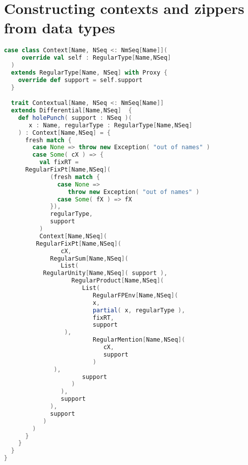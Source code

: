 \section{Constructing contexts and zippers from data types}

\begin{lstlisting}[language=Scala]
  case class Context[Name, NSeq <: NmSeq[Name]](
     override val self : RegularType[Name,NSeq]
  )
  extends RegularType[Name, NSeq] with Proxy {
    override def support = self.support
  }

  trait Contextual[Name, NSeq <: NmSeq[Name]]
  extends Differential[Name,NSeq]  {
    def holePunch( support : NSeq )(
       x : Name, regularType : RegularType[Name,NSeq]
    ) : Context[Name,NSeq] = {
      fresh match {
        case None => throw new Exception( "out of names" )
        case Some( cX ) => {
          val fixRT =
	  RegularFixPt[Name,NSeq](
             (fresh match {
               case None =>
                  throw new Exception( "out of names" )
               case Some( fX ) => fX
             }),
             regularType,
             support
          )
          Context[Name,NSeq](
	     RegularFixPt[Name,NSeq](
                cX,
             RegularSum[Name,NSeq](
                List(
		   RegularUnity[Name,NSeq]( support ),
                   RegularProduct[Name,NSeq](
                      List(
                         RegularFPEnv[Name,NSeq](
                         x,
                         partial( x, regularType ),
                         fixRT,
                         support
		         ),
                         RegularMention[Name,NSeq](
                            cX,
                            support
                         )
		      ),
                      support
                   )
                ),
                support
             ),
             support
           )
        )
      }
    }
  }
}
\end{lstlisting}